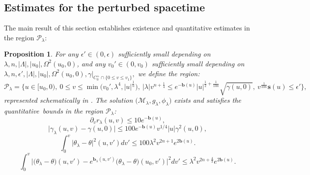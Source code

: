 \documentclass[11pt]{article}
\newtheorem{proposition}{Proposition}[section]
\numberwithin{equation}{section}
\begin{document}
\subsection{Estimates for the perturbed spacetime}\label{estimates for perturbed spacetime section}
The main result of this section establishes existence and quantitative estimates in the region $\mathcal{P}_{\lambda}:$
\begin{proposition}\label{bounds for perturbed spacetime proposition}
    For any $\epsilon'\in(0,\epsilon)$ sufficiently small depending on $\lambda,n,|\Lambda|,|u_0|,\Omega^2(u_0,0)$, and any $v_0'\in(0,v_0)$ sufficiently small depending on $\lambda,n,\epsilon',|\Lambda|,|u_0|,\Omega^2(u_0,0),\gamma|_{C_0^+\cap\{0\leq v\leq v_1\}},$ we define the region:
    \begin{equation}\label{definition of P lambda}
    \mathcal{P}_{\lambda}=\bigg\{u\in[u_0,0),\ 0\leq v\leq\min\big(v_0',\lambda^4,|u|^{\frac{1}{n}}\big),\ |\lambda| v^{n+\frac{1}{4}}\leq e^{-\mathbf{b}(u)}|u|^{\frac{1}{2}+\frac{1}{10n}}\sqrt{\gamma(u,0)},\ v^{\frac{1}{10n}}\mathbf{s}(u)\leq\epsilon'\bigg\},
    \end{equation}
    represented schematically in . The solution $\big(\mathcal{M}_{\lambda},g_{\lambda},\phi_{\lambda}\big)$ exists and satisfies the quantitative~bounds in the region $\mathcal{P}_{\lambda}$:
    \begin{equation}\label{B1 blueshift instability}
    \partial_vr_{\lambda}(u,v)\leq 10e^{-\mathbf{b}(u)},
\end{equation}
\begin{equation}\label{B2 blueshift instability}
    \big|\gamma_{\lambda}(u,v)-\gamma(u,0)\big|\leq 100e^{-\mathbf{b}(u)}v^{1/4}|u|\gamma^2(u,0),
\end{equation}
\begin{equation}\label{B3 blueshift instability}
    \int_0^v\big|\theta_{\lambda}-\theta\big|^2(u,v')dv'\leq 100\lambda^2v^{2n+1}e^{2\mathbf{b}(u)}.
\end{equation}
\begin{equation}\label{B4 blueshift instability}
    \int_0^v\Big|\big(\theta_{\lambda}-\theta\big)(u,v')-e^{\mathbf{b}_{\lambda}(u,v')}\big(\theta_{\lambda}-\theta\big)(u_0,v')\Big|^2dv'\leq\lambda^2v^{2n+\frac{4}{3}}e^{2\mathbf{b}(u)}.
\end{equation}
\end{proposition}
\end{document}
